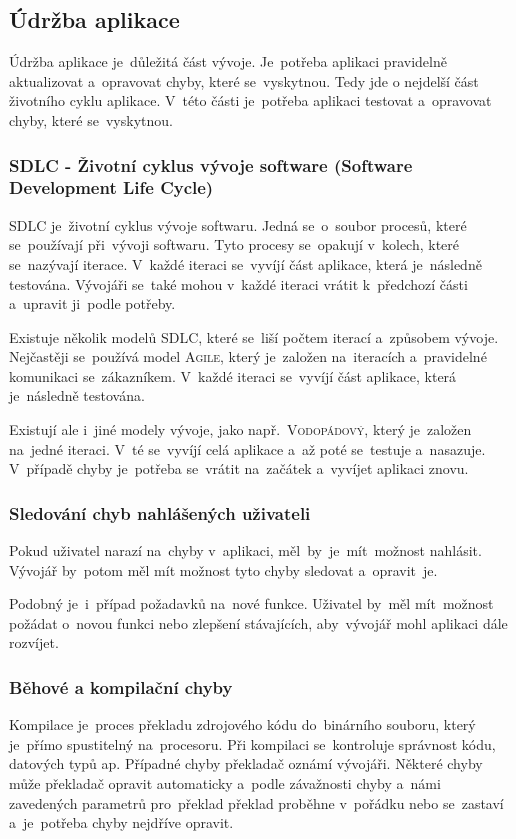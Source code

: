 \documentclass[14pt,a4paper]{article}
\begin{document}
        \subsection{Údržba aplikace}
        Údržba aplikace je~důležitá část vývoje. Je~potřeba aplikaci pravidelně aktualizovat a~opravovat chyby, které se~vyskytnou.
        Tedy jde o nejdelší část životního cyklu aplikace. V~této části je~potřeba aplikaci testovat a~opravovat chyby, které se~vyskytnou.
            
            \subsubsection{SDLC - Životní cyklus vývoje software (Software Development Life Cycle)}
            SDLC je~životní cyklus vývoje softwaru. Jedná se~o~soubor procesů, které se~používají při~vývoji softwaru.
            Tyto procesy se~opakují v~kolech, které se~nazývají iterace. V~každé iteraci se~vyvíjí část aplikace, která je~následně testována.
            Vývojáři se~také mohou v~každé iteraci vrátit k~předchozí části a~upravit ji~podle potřeby.
            
            Existuje několik modelů \textsc{SDLC}, které se~liší počtem iterací a~způsobem vývoje. Nejčastěji se~používá model \textsc{Agile},
            který je~založen na~iteracích a~pravidelné komunikaci se~zákazníkem. V~každé iteraci se~vyvíjí část aplikace, která je~následně testována.
            
            Existují ale i~jiné modely vývoje, jako např.~\textsc{Vodopádový}, který je~založen na~jedné iteraci.
            V~té se~vyvíjí celá aplikace a~až poté se~testuje a~nasazuje.
            V~případě chyby je~potřeba se~vrátit na~začátek a~vyvíjet aplikaci znovu.

            \subsubsection{Sledování chyb nahlášených uživateli}
            Pokud uživatel narazí na~chyby v~aplikaci, měl~by~je~mít~možnost nahlásit. Vývojář by~potom měl mít možnost tyto chyby sledovat a~opravit~je.

            Podobný je~i~případ požadavků na~nové funkce. Uživatel by~měl mít~možnost požádat o~novou funkci nebo zlepšení stávajících,
            aby~vývojář mohl aplikaci dále rozvíjet.

            \subsubsection{Běhové a kompilační chyby}
            Kompilace je~proces překladu zdrojového kódu do~binárního souboru, který je~přímo spustitelný na~procesoru.
            Při kompilaci se~kontroluje správnost kódu, datových typů ap. Případné chyby překladač oznámí vývojáři.
            Některé chyby může překladač opravit automaticky a~podle závažnosti chyby a~námi zavedených parametrů pro~překlad
            překlad proběhne v~pořádku nebo se~zastaví a~je~potřeba chyby nejdříve opravit.
\end{document}
